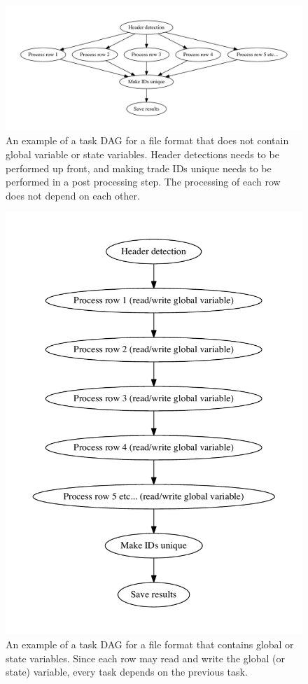 \begin{figure}
  \centering
  \includegraphics[width=200mm]{figures/embarrassing_file_format.pdf}
  \caption[Task DAG for a file format that does not contain global or state variables.]{An example of a task DAG for a file format that does not contain global variable or state variables. Header detections needs
  to be performed up front, and making trade IDs unique needs to be performed in a post processing step. The processing of each row does not depend on each other.}
  \label{fig:embarrassing_dag}
\end{figure}

\begin{figure}[ht]
  \centering
  \includegraphics[width=120mm]{figures/global_variable_file_format.pdf}
  \caption[Task DAG for a file format that contains global or state variables.]{An example of a task DAG for a file format that contains global or state variables. Since each row may read and
  write the global (or state) variable, every task depends on the previous task.}
  \label{fig:global_dag}
\end{figure}

